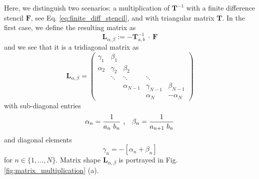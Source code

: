 Here, we distinguish two scenarios: a multiplication of $\mathbf{T}^{-1}$ with a finite difference stencil $\mathbf{F}$, see Eq. \eqref{eq:finite_diff_stencil}, and with triangular matrix $\mathbf{T}$. In the first case, we define the resulting matrix as
\begin{equation}
	\mathbf{L}_{\alpha,\beta} := -\mathbf{T}_{a,b}^{-1} ~\cdot~ \mathbf{F}
\end{equation}
and we see that it is a tridiagonal matrix as
\begin{equation}
	\mathbf{L}_{\alpha,\beta} =
	\begin{pmatrix}
		\gamma_{1} & \beta_{1} \\
		\alpha_{2} & \gamma_{2} & \beta_{2} \\
		& \ddots & \ddots & \ddots \\
		& & \alpha_{N-1} & \gamma_{N-1} & \beta_{N-1} \\
		& & & \alpha_{N} & -\alpha_{N}
	\end{pmatrix}
\end{equation}
with sub-diagonal entries
\begin{equation}
	\alpha_{n} = \frac{1}{a_{n}~ b_{n}} ~ \text{,} \quad 
	\beta_{n} =  \frac{1}{a_{n+1}~ b_{n}} \\
\end{equation}
and diagonal elements
\begin{equation*}
	\gamma_{n} = -\left[\alpha_{n}+\beta_{n}\right]
\end{equation*}
for $n\in\{1,\ldots,N\}$. Matrix shape $\mathbf{L}_{\alpha,\beta}$ is portrayed in Fig. \ref{fig:matrix_multiplication} (a).

